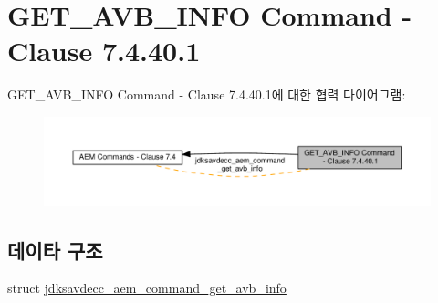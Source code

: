 \hypertarget{group__command__get__avb__info}{}\section{G\+E\+T\+\_\+\+A\+V\+B\+\_\+\+I\+N\+FO Command -\/ Clause 7.4.40.1}
\label{group__command__get__avb__info}
G\+E\+T\+\_\+\+A\+V\+B\+\_\+\+I\+N\+FO Command -\/ Clause 7.4.40.1에 대한 협력 다이어그램\+:
\nopagebreak
\begin{figure}[H]
\begin{center}
\leavevmode
\includegraphics[width=350pt]{group__command__get__avb__info}
\end{center}
\end{figure}
\subsection*{데이타 구조}
\begin{DoxyCompactItemize}
\item 
struct \hyperlink{structjdksavdecc__aem__command__get__avb__info}{jdksavdecc\+\_\+aem\+\_\+command\+\_\+get\+\_\+avb\+\_\+info}
\end{DoxyCompactItemize}
